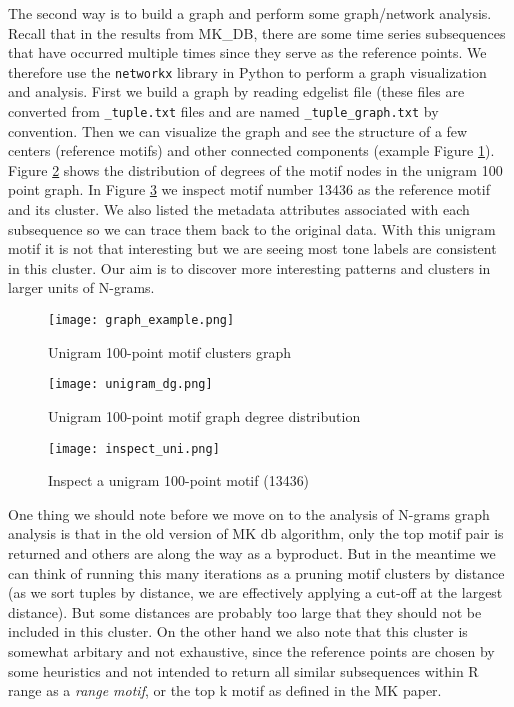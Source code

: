 \documentclass[11pt]{article}
\begin{document}
The second way is to build a graph and perform some graph/network analysis. Recall that in the results from MK\_DB, there are some time series subsequences that have occurred multiple times since they serve as the reference points. We therefore use the \texttt{networkx} library in Python to perform a graph visualization and analysis. First we build a graph by reading edgelist file (these files are converted from \texttt{\_tuple.txt} files and are named \texttt{\_tuple\_graph.txt} by convention. Then we can visualize the graph and see the structure of a few centers (reference motifs) and other connected components (example Figure \ref{fig:graphex}). Figure \ref{fig:degreeuni} shows the distribution of degrees of the motif nodes in the unigram 100 point graph. In Figure \ref{fig:inspectuni} we inspect motif number 13436 as the reference motif and its cluster. We also listed the metadata attributes associated with each subsequence so we can trace them back to the original data. With this unigram motif it is not that interesting but we are seeing most tone labels are consistent in this cluster. Our aim is to discover more interesting patterns and clusters in larger units of N-grams.

\begin{figure}
\small
 \centerline{
 \texttt{[image: graph\_example.png]}}
 \caption{Unigram 100-point motif clusters graph}
 \label{fig:graphex}
\end{figure}

\begin{figure}
\small
 \centerline{
 \texttt{[image: unigram\_dg.png]}}
 \caption{Unigram 100-point motif graph degree distribution}
 \label{fig:degreeuni}
\end{figure}
\begin{figure}
\small
 \centerline{
 \texttt{[image: inspect\_uni.png]}}
 \caption{Inspect a unigram 100-point motif (13436)}
 \label{fig:inspectuni}
\end{figure}

One thing we should note before we move on to the analysis of N-grams graph analysis is that in the old version of MK db algorithm, only the top motif pair is returned and others are along the way as a byproduct. But in the meantime we can think of running this many iterations as a pruning motif clusters by distance (as we sort tuples by distance, we are effectively applying a cut-off at the largest distance). But some distances are probably too large that they should not be included in this cluster. On the other hand we also note that this cluster is somewhat arbitary and not exhaustive, since the reference points are chosen by some heuristics and not intended to return all similar subsequences within R range as a \textit{range motif}, or the top k motif as defined in the MK paper. 
\end{document}
